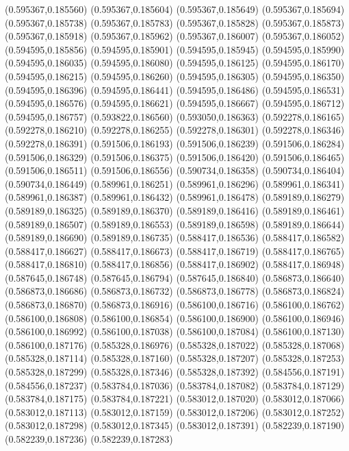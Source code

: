 (0.595367,0.185560)
(0.595367,0.185604)
(0.595367,0.185649)
(0.595367,0.185694)
(0.595367,0.185738)
(0.595367,0.185783)
(0.595367,0.185828)
(0.595367,0.185873)
(0.595367,0.185918)
(0.595367,0.185962)
(0.595367,0.186007)
(0.595367,0.186052)
(0.594595,0.185856)
(0.594595,0.185901)
(0.594595,0.185945)
(0.594595,0.185990)
(0.594595,0.186035)
(0.594595,0.186080)
(0.594595,0.186125)
(0.594595,0.186170)
(0.594595,0.186215)
(0.594595,0.186260)
(0.594595,0.186305)
(0.594595,0.186350)
(0.594595,0.186396)
(0.594595,0.186441)
(0.594595,0.186486)
(0.594595,0.186531)
(0.594595,0.186576)
(0.594595,0.186621)
(0.594595,0.186667)
(0.594595,0.186712)
(0.594595,0.186757)
(0.593822,0.186560)
(0.593050,0.186363)
(0.592278,0.186165)
(0.592278,0.186210)
(0.592278,0.186255)
(0.592278,0.186301)
(0.592278,0.186346)
(0.592278,0.186391)
(0.591506,0.186193)
(0.591506,0.186239)
(0.591506,0.186284)
(0.591506,0.186329)
(0.591506,0.186375)
(0.591506,0.186420)
(0.591506,0.186465)
(0.591506,0.186511)
(0.591506,0.186556)
(0.590734,0.186358)
(0.590734,0.186404)
(0.590734,0.186449)
(0.589961,0.186251)
(0.589961,0.186296)
(0.589961,0.186341)
(0.589961,0.186387)
(0.589961,0.186432)
(0.589961,0.186478)
(0.589189,0.186279)
(0.589189,0.186325)
(0.589189,0.186370)
(0.589189,0.186416)
(0.589189,0.186461)
(0.589189,0.186507)
(0.589189,0.186553)
(0.589189,0.186598)
(0.589189,0.186644)
(0.589189,0.186690)
(0.589189,0.186735)
(0.588417,0.186536)
(0.588417,0.186582)
(0.588417,0.186627)
(0.588417,0.186673)
(0.588417,0.186719)
(0.588417,0.186765)
(0.588417,0.186810)
(0.588417,0.186856)
(0.588417,0.186902)
(0.588417,0.186948)
(0.587645,0.186748)
(0.587645,0.186794)
(0.587645,0.186840)
(0.586873,0.186640)
(0.586873,0.186686)
(0.586873,0.186732)
(0.586873,0.186778)
(0.586873,0.186824)
(0.586873,0.186870)
(0.586873,0.186916)
(0.586100,0.186716)
(0.586100,0.186762)
(0.586100,0.186808)
(0.586100,0.186854)
(0.586100,0.186900)
(0.586100,0.186946)
(0.586100,0.186992)
(0.586100,0.187038)
(0.586100,0.187084)
(0.586100,0.187130)
(0.586100,0.187176)
(0.585328,0.186976)
(0.585328,0.187022)
(0.585328,0.187068)
(0.585328,0.187114)
(0.585328,0.187160)
(0.585328,0.187207)
(0.585328,0.187253)
(0.585328,0.187299)
(0.585328,0.187346)
(0.585328,0.187392)
(0.584556,0.187191)
(0.584556,0.187237)
(0.583784,0.187036)
(0.583784,0.187082)
(0.583784,0.187129)
(0.583784,0.187175)
(0.583784,0.187221)
(0.583012,0.187020)
(0.583012,0.187066)
(0.583012,0.187113)
(0.583012,0.187159)
(0.583012,0.187206)
(0.583012,0.187252)
(0.583012,0.187298)
(0.583012,0.187345)
(0.583012,0.187391)
(0.582239,0.187190)
(0.582239,0.187236)
(0.582239,0.187283)
